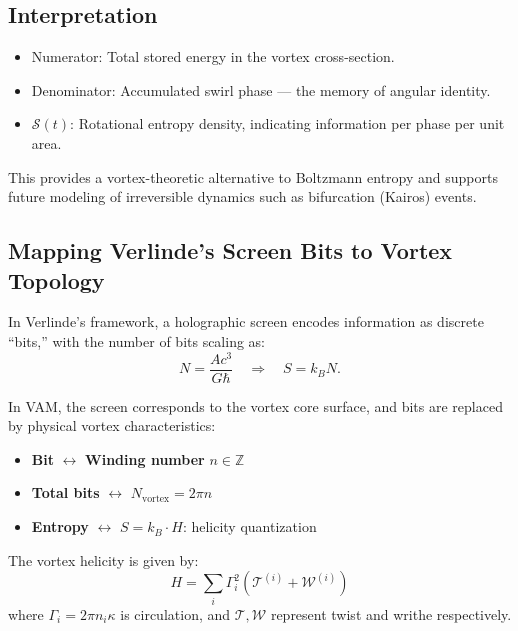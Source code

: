 \documentclass[preprint]{revtex4-2}
\begin{document}
            \subsection*{Interpretation}
            \begin{itemize}
            \item Numerator: Total stored energy in the vortex cross-section.
            \item Denominator: Accumulated swirl phase — the memory of angular identity.
                \item $\mathcal{S}(t)$: Rotational entropy density, indicating information per phase per unit area.
            \end{itemize}

            This provides a vortex-theoretic alternative to Boltzmann entropy and supports future modeling of irreversible dynamics such as bifurcation (Kairos) events.

            \subsection{Mapping Verlinde's Screen Bits to Vortex Topology}
            In Verlinde's framework, a holographic screen encodes information as discrete ``bits,'' with the number of bits scaling as:
            \begin{equation}
            N = \frac{A c^3}{G \hbar} \quad \Rightarrow \quad S = k_B N.
            \end{equation}

            In VAM, the screen corresponds to the vortex core surface, and bits are replaced by physical vortex characteristics:
            \begin{itemize}
                \item \textbf{Bit} $\leftrightarrow$ \textbf{Winding number} $n \in \mathbb{Z}$
                \item \textbf{Total bits} $\leftrightarrow$ $N_\text{vortex} = 2\pi n$
                \item \textbf{Entropy} $\leftrightarrow$ $S = k_B \cdot H$: helicity quantization
            \end{itemize}

            The vortex helicity is given by:
            \begin{equation}
            H = \sum_i \Gamma_i^2 (\mathcal{T}^{(i)} + \mathcal{W}^{(i)})
            \end{equation}
            where $\Gamma_i = 2\pi n_i \kappa$ is circulation, and $\mathcal{T}, \mathcal{W}$ represent twist and writhe respectively.
\end{document}
